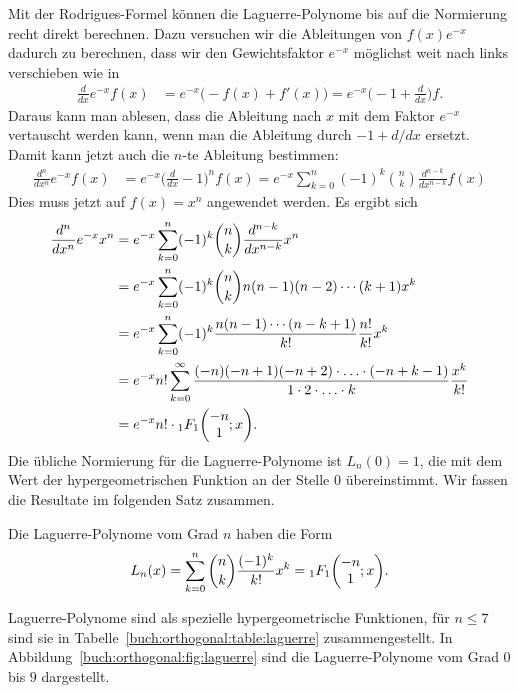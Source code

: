 Mit der Rodrigues-Formel können die Laguerre-Polynome bis auf
die Normierung recht direkt berechnen.
Dazu versuchen wir die Ableitungen von $f(x)e^{-x}$ dadurch zu
berechnen, dass wir den Gewichtsfaktor $e^{-x}$ möglichst weit
nach links verschieben wie in
\begin{align*}
\frac{d}{dx}
e^{-x}
f(x)
&=
e^{-x}
\bigl( -f(x) + f'(x) \bigr)
=
e^{-x}
\biggl( -1 + \frac{d}{dx}\biggr) f.
\end{align*}
Daraus kann man ablesen, dass die Ableitung nach $x$ mit dem Faktor
$e^{-x}$ vertauscht werden kann, wenn man die Ableitung durch
$-1+d/dx$ ersetzt.
Damit kann jetzt auch die $n$-te Ableitung bestimmen:
\begin{align*}
\frac{d^n}{dx^n}e^{-x}f(x)
&=
e^{-x} \biggl(\frac{d}{dx}-1\biggr)^n f(x)
=
e^{-x} \sum_{k=0}^n (-1)^{k}\binom{n}{k}\frac{d^{n-k}}{dx^{n-k}} f(x)
\end{align*}
Dies muss jetzt auf $f(x)=x^n$ angewendet werden.
Es ergibt sich
\begin{align*}
\frac{d^n}{dx^n}e^{-x}x^n
&=
e^{-x} \sum_{k=0}^n (-1)^{k}\binom{n}{k}\frac{d^{n-k}}{dx^{n-k}} x^n
\\
&=
e^{-x} \sum_{k=0}^n (-1)^{k}\binom{n}{k}
n(n-1)(n-2)\cdots (k+1)
x^k
\\
&=
e^{-x}
\sum_{k=0}^n (-1)^k \frac{n(n-1)\cdots(n-k+1)}{k!}
\frac{n!}{k!}
x^k
\\
&=
e^{-x} n!
\sum_{k=0}^\infty
\frac{(-n)(-n+1)(-n+2)\cdot\ldots\cdot (-n+k-1)}{1\cdot 2\cdot \ldots\cdot k}
\frac{x^k}{k!}
\\
&=
e^{-x} n!
\cdot
\mathstrut_1F_1\biggl(
\begin{matrix}-n\\1\end{matrix}; x
\biggr).
\end{align*}
Die übliche Normierung für die Laguerre-Polynome ist $L_n(0)=1$,
die mit dem Wert der hypergeometrischen Funktion an der Stelle $0$
übereinstimmt.
Wir fassen die Resultate im folgenden Satz zusammen.

\begin{satz}
%
%
Die Laguerre-Polynome vom Grad $n$ haben die Form
\begin{equation}
L_n(x)
=
\sum_{k=0}^n \binom{n}{k}\frac{(-1)^k}{k!}x^k
=
\mathstrut_1F_1\biggl(\begin{matrix}-n\\1\end{matrix};x\biggr).
\label{buch:orthogonal:eqn:laguerre-polynom-hypergeometrisch}
\end{equation}
\end{satz}
Laguerre-Polynome sind als spezielle hypergeometrische Funktionen,
für $n\le 7$ sind sie 
in Tabelle~\ref{buch:orthogonal:table:laguerre} zusammengestellt.
In Abbildung~\ref{buch:orthogonal:fig:laguerre} sind die Laguerre-Polynome
vom Grad $0$ bis $9$ dargestellt.

